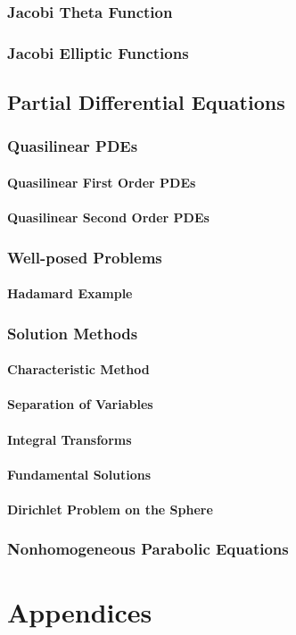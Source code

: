 \documentclass{book}
\begin{document}
\section{Jacobi Theta Function}
\section{Jacobi Elliptic Functions}

\chapter{Partial Differential Equations}
\section{Quasilinear PDEs}
\subsection{Quasilinear First Order PDEs}
\subsection{Quasilinear Second Order PDEs}
\section{Well-posed Problems}
\subsection{Hadamard Example}
\section{Solution Methods}
\subsection{Characteristic Method}
\subsection{Separation of Variables}
\subsection{Integral Transforms}
\subsection{Fundamental Solutions}
\subsection{Dirichlet Problem on the Sphere}
\section{Nonhomogeneous Parabolic Equations}
\part*{Appendices}
\appendix




\printbibliography
\nocite{manifoldcalc,lanzara,complessa,funzionalecesi,metodi2,pradisi1,pradisi2}
\end{document}
